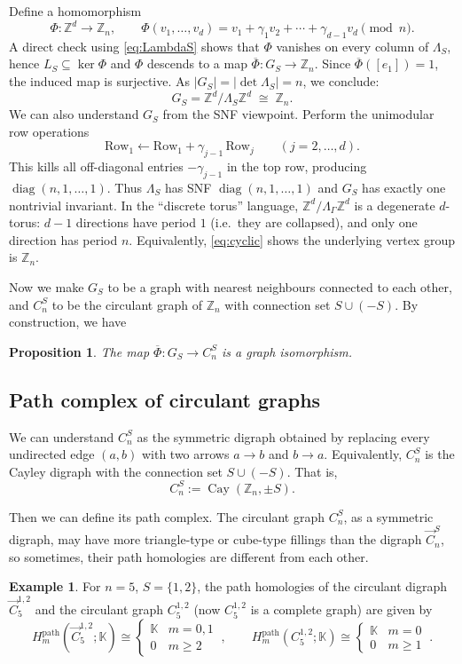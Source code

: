 \documentclass[11pt]{amsart}
\DeclareMathOperator{\diag}{diag}
\DeclareMathOperator{\Cay}{Cay}
\newcommand{\Z}{\mathbb Z}
\newcommand{\K}{\mathbb K}
\theoremstyle{plain}
\newtheorem{proposition}[theorem]{Proposition}
\theoremstyle{definition}
\newtheorem{example}[theorem]{Example}
\numberwithin{equation}{section}
\begin{document}
Define a homomorphism
\[
\Phi:\Z^d\to \Z_n,\qquad \Phi(v_1,\dots,v_d)=v_1+\gamma_1v_2+\cdots+\gamma_{d-1}v_d\pmod n.
\]
A direct check using \eqref{eq:LambdaS} shows that $\Phi$ vanishes on every column of $\Lambda_S$,
hence $L_S\subseteq \ker\Phi$ and $\Phi$ descends to a map $\overline{\Phi}:G_S\to \Z_n$.
Since $\overline{\Phi}([e_1])=1$, the induced map is surjective.  As $|G_S|=|\det \Lambda_S|=n$,
we conclude:
\begin{equation}\label{eq:cyclic}
G_S=\Z^d/\Lambda_S\Z^d\;\cong\;\Z_n.
\end{equation}
We can also understand $G_S$ from the SNF viewpoint. Perform the unimodular row operations
\[
\text{Row}_1 \leftarrow \text{Row}_1+\gamma_{j-1}\,\text{Row}_j\qquad(j=2,\dots,d).
\]
This kills all off-diagonal entries $-\gamma_{j-1}$ in the top row, producing $\diag(n,1,\dots,1)$.
Thus $\Lambda_S$ has SNF $\diag(n,1,\dots,1)$ and $G_S$ has exactly one nontrivial invariant.
In the ``discrete torus'' language, $\Z^d/\Lambda_\Gamma\Z^d$ is a degenerate $d$-torus: $d-1$ directions have
period $1$ (i.e.\ they are collapsed), and only one direction has period $n$.
Equivalently, \eqref{eq:cyclic} shows the underlying vertex group is $\Z_n$.


Now we make $G_S$ to be a graph with nearest neighbours connected to each other, and $C_n^S$ to be the circulant graph of $\Z_n$ with connection set $S\cup(-
S)$. By construction, we have

\begin{proposition}
The map $\overline{\Phi}:G_S\rightarrow C_n^S$ is a graph isomorphism.    
\end{proposition}

\subsection{Path complex of circulant graphs}\label{sub:circulatgraph}
We can understand $C_n^S$ as the symmetric digraph obtained
by replacing every undirected edge $(a,b)$ with two arrows $a\rightarrow b$ and $b\rightarrow a$. Equivalently, $C_n^S$ is the Cayley digraph with the connection set $S\cup (-S)$. That is,
\[C_n^S:=\Cay(\Z_n,\pm S).\]

Then we can define its path complex. The circulant graph $C_n^S$, as a symmetric digraph, may have more triangle-type or cube-type fillings than the digraph $\vec{C}_n^S$, so sometimes, their path homologies are different from each other.

\begin{example}
For $n=5$, $S=\{1,2\}$, 
the path homologies of the circulant digraph $\vec{C}_5^{1,2}$ and the circulant graph $C_5^{1,2}$ (now $C_5^{1,2}$ is a complete graph) are given by
\[
H_m^{\mathrm{path}}(\vec{C}_5^{1,2};\K)\cong\begin{cases}
    \K  & m=0,1\\ 
    0  & m\geq2
\end{cases}~,\qquad
H_m^{\mathrm{path}}(C_5^{1,2};\K)\cong\begin{cases}
    \K  & m=0\\ 
    0  & m\geq1
\end{cases}~.
\]    
\end{example}
\end{document}
